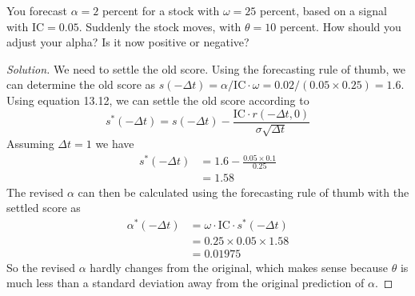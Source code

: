 \begin{problem}{13.3}
  You forecast $\alpha=2$ percent for a stock with $\omega=25$ percent, based on a signal with $\mathrm{IC}=0.05$. Suddenly the stock moves, with $\theta=10$ percent. How should you adjust your alpha? Is it now positive or negative?
\end{problem}

\begin{proof}[Solution]
  We need to settle the old score. Using the forecasting rule of thumb, we can determine the old score as $s(-\Delta t)=\alpha/\mathrm{IC}\cdot \omega=0.02/(0.05\times 0.25)=1.6$. Using equation 13.12, we can settle the old score according to
  \begin{equation*}
   s^{*}(-\Delta t)=s(-\Delta t) - \frac{\mathrm{IC}\cdot r(-\Delta t,0)}{\sigma\sqrt{\Delta t}}
  \end{equation*}
  Assuming $\Delta t = 1$ we have
  \begin{align*}
   s^{*}(-\Delta t)&=1.6 - \frac{0.05\times 0.1}{0.25}\\
		   &=1.58
  \end{align*}
  The revised $\alpha$ can then be calculated using the forecasting rule of thumb with the settled score as
  \begin{align*}
   \alpha^{*}(- \Delta t ) &= \omega \cdot \mathrm{IC} \cdot s^{*}(-\Delta t) \\
			   &= 0.25 \times 0.05 \times 1.58 \\
			   &= 0.01975
  \end{align*}
  So the revised $\alpha$ hardly changes from the original, which makes sense because $\theta$ is much less than a standard deviation away from the original prediction of $\alpha$. 


\end{proof}